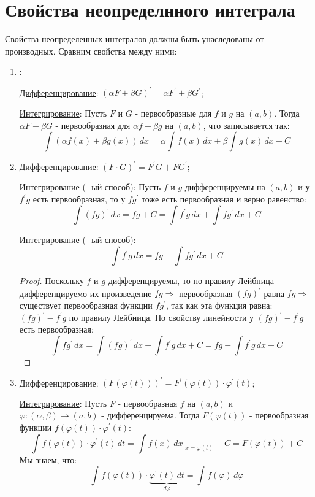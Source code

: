 \documentclass[12pt]{article}
\newcommand{\RN}[1]{%
	\textup{\uppercase\expandafter{\romannumeral#1}}%
}
\theoremstyle{definition}
\begin{document}
\section*{Свойства неопределнного интеграла}
Свойства неопределенных интегралов должны быть унаследованы от производных. Сравним свойства между ними:
\begin{enumerate}[label={(\arabic*)}]
	\item \textbf{}:
	
	\uline{Дифференцирование}: $(\alpha F + \beta G)^\prime = \alpha F^\prime + \beta G^\prime$;
	
	\uline{Интегрирование}: Пусть $F$ и $G$ - первообразные для $f$ и $g$ на $(a,b)$. Тогда $\alpha F + \beta G$ - первообразная для $\alpha f + \beta g$ на $(a,b)$, что записывается так:
	$$\int (\alpha f(x) + \beta g(x))\,dx = \alpha \int f(x) \, dx + \beta \int g(x) \, dx + C$$
	
	\item \textbf{}
	
	\uline{Дифференцирование}: $(F{\cdot}G)^\prime = F^\prime G + FG^\prime$;
	
	\uline{Интегрирование (\RN{1}-ый способ)}: Пусть $f$ и $g$ дифференцируемы на $(a,b)$ и у $f^\prime g$ есть первообразная, то у $fg^\prime$ тоже есть первообразная и верно равенство:
	$$\int (fg)^\prime \, dx = fg + C = \int f^\prime g \, dx + \int fg^\prime \, dx + C$$
	
	\uline{Интегрирование (\RN{2}-ый способ)}: $$\int f^\prime g \, dx = fg - \int fg^\prime \, dx + C$$
	\begin{proof}
		Поскольку $f$ и $g$ дифференцируемы, то по правилу Лейбница дифференцируемо их произведение $fg \Rightarrow$ первообразная $(fg)^\prime$ равна $fg \Rightarrow$ существует первообразная функции $fg^\prime$, так как эта функция равна: $(fg)^\prime - f^\prime g$ по правилу Лейбница. По свойству линейности у $(fg)^\prime - f^\prime g$ есть первообразная:
		$$\int fg^\prime \, dx = \int (fg)^\prime \, dx - \int f^\prime g \, dx + C = fg - \int f^\prime g \,dx + C$$ 
	\end{proof}
	
	\item \textbf{}
	
	\uline{Дифференцирование}: $(F(\varphi(t)))^\prime = F^\prime(\varphi(t)){\cdot} \varphi^\prime(t)$;
	
	\uline{Интегрирование}: Пусть $F$ - первообразная $f$ на $(a,b)$ и $\varphi\colon (\alpha, \beta) \to (a,b)$ - дифференцируема. Тогда $F(\varphi(t))$ - первообразная функции $f(\varphi(t)){\cdot}\varphi^\prime(t)$:
	$$\int f(\varphi(t)){\cdot}\varphi^\prime(t)\,dt = \int f(x) \, dx 
	\bigg\rvert_{x = \varphi(t)} + C = F(\varphi(t)) + C$$
	Мы знаем, что:
	$$\int f(\varphi(t)){\cdot}\underbrace{\varphi^\prime(t)\,dt}_{d\varphi} = \int f(\varphi)\, d \varphi$$
\end{enumerate}
\end{document}
